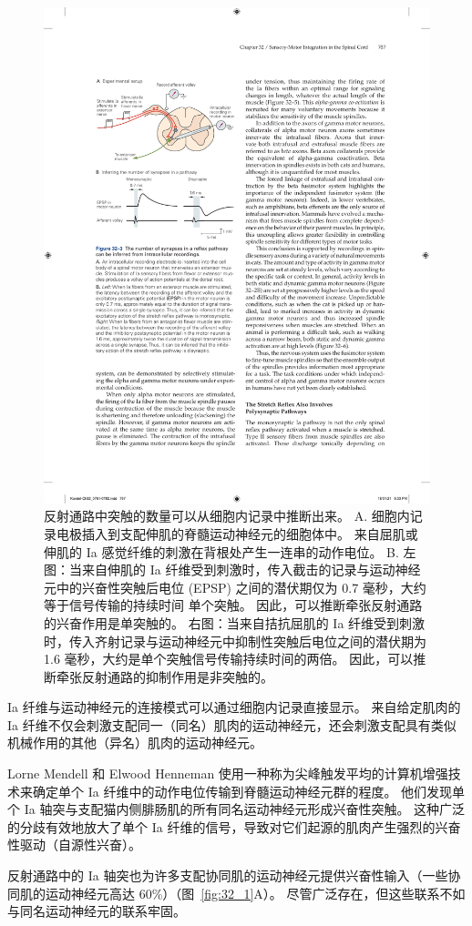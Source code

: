\begin{figure}[htbp]
	\centering
	\includegraphics[width=0.5\linewidth]{chap32/fig_32_3}
	\caption{反射通路中突触的数量可以从细胞内记录中推断出来。
		A. 细胞内记录电极插入到支配伸肌的脊髓运动神经元的细胞体中。
		来自屈肌或伸肌的 Ia 感觉纤维的刺激在背根处产生一连串的动作电位。
		B. 左图：当来自伸肌的 Ia 纤维受到刺激时，传入截击的记录与运动神经元中的兴奋性突触后电位 (EPSP) 之间的潜伏期仅为 0.7 毫秒，大约等于信号传输的持续时间 单个突触。
		因此，可以推断牵张反射通路的兴奋作用是单突触的。
		右图：当来自拮抗屈肌的 Ia 纤维受到刺激时，传入齐射记录与运动神经元中抑制性突触后电位之间的潜伏期为 1.6 毫秒，大约是单个突触信号传输持续时间的两倍。
		因此，可以推断牵张反射通路的抑制作用是非突触的。}
	\label{fig:32_3}
\end{figure}


Ia 纤维与运动神经元的连接模式可以通过细胞内记录直接显示。
来自给定肌肉的 Ia 纤维不仅会刺激支配同一（同名）肌肉的运动神经元，还会刺激支配具有类似机械作用的其他（异名）肌肉的运动神经元。


Lorne Mendell 和 Elwood Henneman 使用一种称为尖峰触发平均的计算机增强技术来确定单个 Ia 纤维中的动作电位传输到脊髓运动神经元群的程度。
他们发现单个 Ia 轴突与支配猫内侧腓肠肌的所有同名运动神经元形成兴奋性突触。
这种广泛的分歧有效地放大了单个 Ia 纤维的信号，导致对它们起源的肌肉产生强烈的兴奋性驱动（自源性兴奋）。


反射通路中的 Ia 轴突也为许多支配协同肌的运动神经元提供兴奋性输入（一些协同肌的运动神经元高达 60\%）（图~\ref{fig:32_1}A）。 
尽管广泛存在，但这些联系不如与同名运动神经元的联系牢固。


